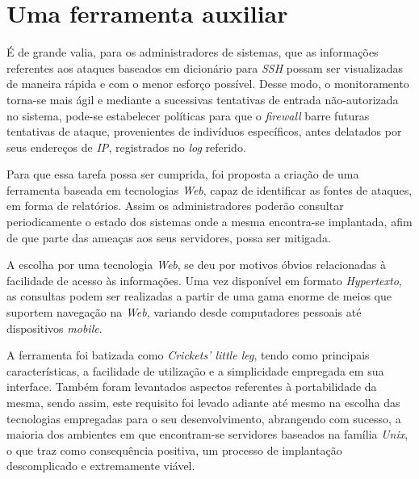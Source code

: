 \section{Uma ferramenta auxiliar}

É de grande valia, para os administradores de sistemas, que as informações referentes aos ataques baseados em dicionário para \textit{SSH} possam ser visualizadas de maneira rápida e com o menor esforço possível. Desse modo, o monitoramento torna-se mais ágil e mediante a sucessivas tentativas de entrada não-autorizada no sistema, pode-se estabelecer políticas para que o \textit{firewall} barre futuras tentativas de ataque, provenientes de indivíduos específicos, antes delatados por seus endereços de \textit{IP}, registrados no \textit{log} referido.

Para que essa tarefa possa ser cumprida, foi proposta a criação de uma ferramenta baseada em tecnologias \textit{Web}, capaz de identificar as fontes de ataques, em forma de relatórios. Assim os administradores poderão consultar periodicamente o estado dos sistemas onde a mesma encontra-se implantada, afim de que parte das ameaças aos seus servidores, possa ser mitigada.

A escolha por uma tecnologia \textit{Web}, se deu por motivos óbvios relacionadas à facilidade de acesso às informações. Uma vez disponível em formato \textit{Hypertexto}, as consultas  podem ser realizadas a partir de uma gama enorme de meios que suportem navegação na \textit{Web}, variando desde computadores pessoais até dispositivos \textit{mobile}.

A ferramenta foi batizada como \textit{Crickets' little leg}, tendo como principais características, a facilidade de utilização e a simplicidade empregada em sua interface. Também foram levantados aspectos referentes à portabilidade da mesma, sendo assim, este requisito foi levado adiante até mesmo na escolha das tecnologias empregadas para o seu desenvolvimento, abrangendo com sucesso, a maioria dos ambientes em que encontram-se servidores baseados na família \textit{Unix}, o que traz como consequência positiva, um processo de implantação descomplicado e extremamente viável.